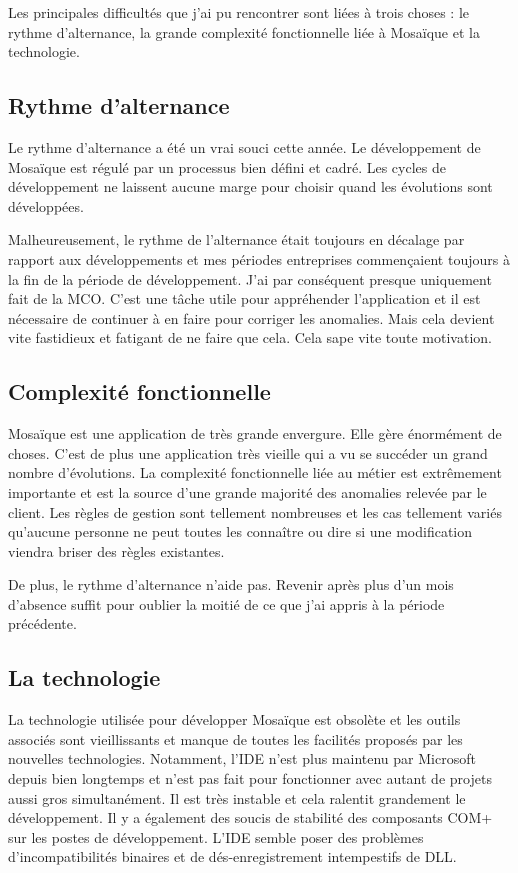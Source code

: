 Les principales difficultés que j'ai pu rencontrer sont liées à trois choses : le rythme d'alternance, la grande complexité fonctionnelle liée à Mosaïque et la technologie.

\subsection{Rythme d'alternance}

    Le rythme d'alternance a été un vrai souci cette année. Le développement de Mosaïque est régulé par un processus bien défini et cadré. Les cycles de développement ne laissent aucune marge pour choisir quand les évolutions sont développées.
    
    Malheureusement, le rythme de l'alternance était toujours en décalage par rapport aux développements et mes périodes entreprises commençaient toujours à la fin de la période de développement. J'ai par conséquent presque uniquement fait de la MCO. C'est une tâche utile pour appréhender l'application et il est nécessaire de continuer à en faire pour corriger les anomalies. Mais cela devient vite fastidieux et fatigant de ne faire que cela. Cela sape vite toute motivation.
    
\clearpage
\subsection{Complexité fonctionnelle}

    Mosaïque est une application de très grande envergure. Elle gère énormément de choses. C'est de plus une application très vieille qui a vu se succéder un grand nombre d'évolutions. La complexité fonctionnelle liée au métier est extrêmement importante et est la source d'une grande majorité des anomalies relevée par le client. Les règles de gestion sont tellement nombreuses et les cas tellement variés qu'aucune personne ne peut toutes les connaître ou dire si une modification viendra briser des règles existantes.
    
    De plus, le rythme d'alternance n'aide pas. Revenir après plus d'un mois d'absence suffit pour oublier la moitié de ce que j'ai appris à la période précédente. 
    
\subsection{La technologie}

    La technologie utilisée pour développer Mosaïque est obsolète et les outils associés sont vieillissants et manque de toutes les facilités proposés par les nouvelles technologies. Notamment, l'IDE n'est plus maintenu par Microsoft depuis bien longtemps et n'est pas fait pour fonctionner avec autant de projets aussi gros simultanément. Il est très instable et cela ralentit grandement le développement. Il y a également des soucis de stabilité des composants COM+ sur les postes de développement. L'IDE semble poser des problèmes d'incompatibilités binaires et de dés-enregistrement intempestifs de DLL.
